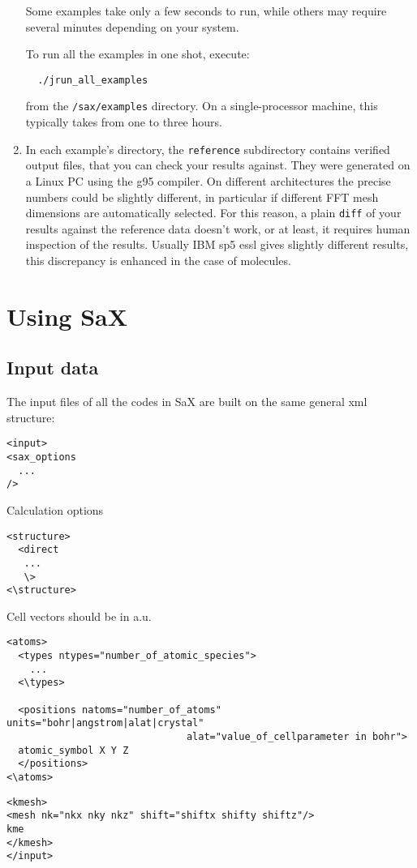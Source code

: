 \documentclass[11pt]{article}
\begin{document}
\begin{enumerate}
Some examples take only a few seconds to run, while others may require
several minutes depending on your system.

To run all the examples in one shot, execute:
\begin{verbatim}
  ./jrun_all_examples
\end{verbatim}
from the \texttt{/sax/examples} directory.
On a single-processor machine, this typically takes from one to three
hours.

  \item
In each example's directory, the \texttt{reference} subdirectory
contains verified output files, that you can check your results
against.
They were generated on a Linux PC using the g95 compiler.
On different architectures the precise numbers could be slightly
different, in particular if different FFT mesh dimensions are automatically
selected.  For this reason, a plain \texttt{diff} of your results
against the reference data doesn't work, or at least, it requires
human inspection of the results. Usually IBM sp5 essl gives slightly 
different results, this discrepancy is enhanced in the case of molecules. 

\end{enumerate}

\clearpage

\section{Using SaX}
\subsection{Input data}
The input files of all the codes in SaX are built on the same general xml structure:
\begin{verbatim}
<input>
<sax_options
  ...
/>
\end{verbatim}
Calculation options
\begin{verbatim}
<structure>
  <direct
   ...
   \>
<\structure>
\end{verbatim}

Cell vectors should be in a.u.

\begin{verbatim}
<atoms>
  <types ntypes="number_of_atomic_species">
    ...
  <\types>

  <positions natoms="number_of_atoms" units="bohr|angstrom|alat|crystal" 
                               alat="value_of_cellparameter in bohr">
  atomic_symbol X Y Z
  </positions>
<\atoms>
\end{verbatim}
\begin{verbatim}
<kmesh>
<mesh nk="nkx nky nkz" shift="shiftx shifty shiftz"/>
kme
</kmesh>
</input>
\end{verbatim} 
\end{document}
